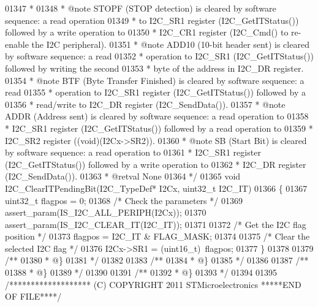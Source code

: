 \begin{DoxyCode}
01347 \textcolor{comment}{  * }
01348 \textcolor{comment}{  * @note   STOPF (STOP detection) is cleared by software sequence: a read operation }
01349 \textcolor{comment}{  *          to I2C\_SR1 register (I2C\_GetITStatus()) followed by a write operation to }
01350 \textcolor{comment}{  *          I2C\_CR1 register (I2C\_Cmd() to re-enable the I2C peripheral).}
01351 \textcolor{comment}{  * @note   ADD10 (10-bit header sent) is cleared by software sequence: a read }
01352 \textcolor{comment}{  *          operation to I2C\_SR1 (I2C\_GetITStatus()) followed by writing the second }
01353 \textcolor{comment}{  *          byte of the address in I2C\_DR register.}
01354 \textcolor{comment}{  * @note   BTF (Byte Transfer Finished) is cleared by software sequence: a read }
01355 \textcolor{comment}{  *          operation to I2C\_SR1 register (I2C\_GetITStatus()) followed by a }
01356 \textcolor{comment}{  *          read/write to I2C\_DR register (I2C\_SendData()).}
01357 \textcolor{comment}{  * @note   ADDR (Address sent) is cleared by software sequence: a read operation to }
01358 \textcolor{comment}{  *          I2C\_SR1 register (I2C\_GetITStatus()) followed by a read operation to }
01359 \textcolor{comment}{  *          I2C\_SR2 register ((void)(I2Cx->SR2)).}
01360 \textcolor{comment}{  * @note   SB (Start Bit) is cleared by software sequence: a read operation to }
01361 \textcolor{comment}{  *          I2C\_SR1 register (I2C\_GetITStatus()) followed by a write operation to }
01362 \textcolor{comment}{  *          I2C\_DR register (I2C\_SendData()).}
01363 \textcolor{comment}{  * @retval None}
01364 \textcolor{comment}{  */}
01365 \textcolor{keywordtype}{void} I2C_ClearITPendingBit(I2C\_TypeDef* I2Cx, uint32\_t I2C\_IT)
01366 \{
01367   uint32\_t flagpos = 0;
01368   \textcolor{comment}{/* Check the parameters */}
01369   assert_param(IS\_I2C\_ALL\_PERIPH(I2Cx));
01370   assert_param(IS\_I2C\_CLEAR\_IT(I2C\_IT));
01371 
01372   \textcolor{comment}{/* Get the I2C flag position */}
01373   flagpos = I2C\_IT & FLAG_MASK;
01374 
01375   \textcolor{comment}{/* Clear the selected I2C flag */}
01376   I2Cx->SR1 = (uint16\_t)~flagpos;
01377 \}
01378 
01379 \textcolor{comment}{/**}
01380 \textcolor{comment}{  * @\}}
01381 \textcolor{comment}{  */}
01382 
01383 \textcolor{comment}{/**}
01384 \textcolor{comment}{  * @\}}
01385 \textcolor{comment}{  */}
01386 
01387 \textcolor{comment}{/**}
01388 \textcolor{comment}{  * @\}}
01389 \textcolor{comment}{  */}
01390 
01391 \textcolor{comment}{/**}
01392 \textcolor{comment}{  * @\}}
01393 \textcolor{comment}{  */}
01394 
01395 \textcolor{comment}{/******************* (C) COPYRIGHT 2011 STMicroelectronics *****END OF FILE****/}
\end{DoxyCode}
